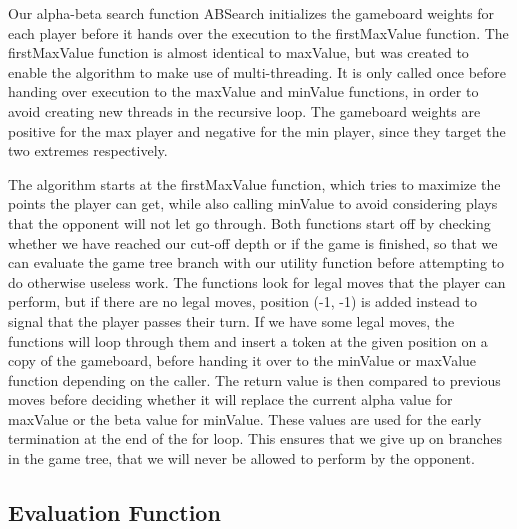 \documentclass{article}
\begin{document}
Our alpha-beta search function ABSearch initializes the gameboard weights for each player before it hands over the execution to the firstMaxValue function. The firstMaxValue function is almost identical to maxValue, but was created to enable the algorithm to make use of multi-threading. It is only called once before handing over execution to the maxValue and minValue functions, in order to avoid creating new threads in the recursive loop.
The gameboard weights are positive for the max player and negative for the min player, since they target the two extremes respectively.

The algorithm starts at the firstMaxValue function, which tries to maximize the points the player can get, while also calling minValue to avoid considering plays that the opponent will not let go through.
Both functions start off by checking whether we have reached our cut-off depth or if the game is finished, so that we can evaluate the game tree branch with our utility function before attempting to do otherwise useless work.
The functions look for legal moves that the player can perform, but if there are no legal moves, position (-1, -1) is added instead to signal that the player passes their turn.
If we have some legal moves, the functions will loop through them and insert a token at the given position on a copy of the gameboard, before handing it over to the minValue or maxValue function depending on the caller. The return value is then compared to previous moves before deciding whether it will replace the current alpha value for maxValue or the beta value for minValue.
These values are used for the early termination at the end of the for loop. This ensures that we give up on branches in the game tree, that we will never be allowed to perform by the opponent.


\subsection{Evaluation Function}
\end{document}
